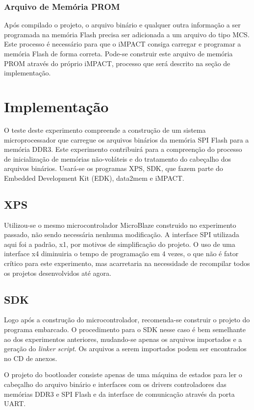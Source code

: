 \documentclass[11pt,a4paper,oneside]{book}
\begin{document}
\subsubsection{Arquivo de Memória PROM}
Após compilado o projeto, o arquivo binário e qualquer outra informação a ser programada na memória Flash precisa ser adicionada a um arquivo do tipo MCS.
Este processo é necessário para que o iMPACT consiga carregar e programar a memória Flash de forma correta.
Pode-se construir este arquivo de memória PROM através do próprio iMPACT, processo que será descrito na seção de implementação.

\section{Implementação}
O teste deste experimento compreende a construção de um sistema microprocessador que carregue os arquivos binários da memória SPI Flash para a memória DDR3.
Este experimento contribuirá para a compreenção do processo de inicialização de memórias não-voláteis e do tratamento do cabeçalho dos arquivos binários.
Usará-se os programas XPS, SDK, que fazem parte do Embedded Development Kit (EDK), data2mem e iMPACT.

\subsection{XPS}
Utilizou-se o mesmo microcontrolador MicroBlaze construido no experimento passado, não sendo necessária nenhuma modificação.
A interface SPI utilizada aqui foi a padrão, x1, por motivos de simplificação do projeto.
O uso de uma interface x4 diminuiria o tempo de programação em 4 vezes, o que não é fator crítico para este experimento, mas acarretaria na necessidade de recompilar todos os projetos desenvolvidos até agora.

\subsection{SDK}
Logo após a construção do microcontrolador, recomenda-se construir o projeto do programa embarcado.
O procedimento para o SDK nesse caso é bem semelhante ao dos experimentos anteriores, mudando-se apenas os arquivos importados e a geração do \textit{linker script}.
Os arquivos a serem importados podem ser encontrados no CD de anexos.

O projeto do bootloader consiste apenas de uma máquina de estados para ler o cabeçalho do arquivo binário e interfaces com os drivers controladores das memórias DDR3 e SPI Flash e da interface de comunicação através da porta UART.
\end{document}

